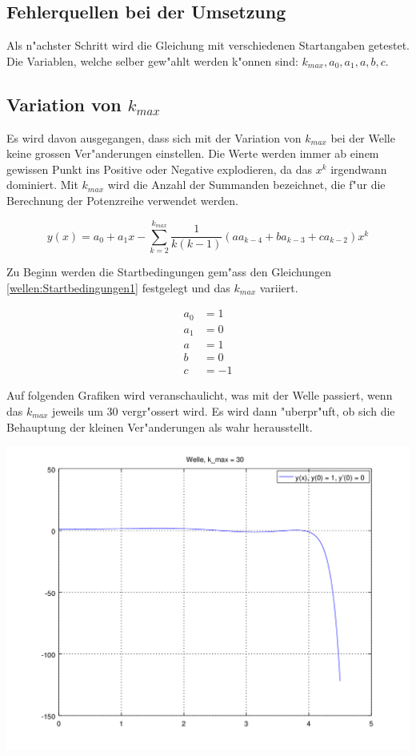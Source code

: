 \begin{refsection}
\section{Fehlerquellen bei der Umsetzung}
Als n"achster Schritt wird die Gleichung mit verschiedenen Startangaben 
getestet. Die Variablen, welche selber gew"ahlt werden k"onnen sind: $k_{max}, 
a_0, 
a_1, a, b, c$.

\subsection{Variation von $k_{max}$}

Es wird davon ausgegangen, dass sich mit der Variation von $k_{max}$ bei der 
Welle keine grossen Ver"anderungen einstellen. Die Werte werden immer ab einem 
gewissen Punkt ins Positive oder Negative explodieren, da das $x^k$ irgendwann 
dominiert. Mit $k_{max}$ wird die Anzahl der Summanden bezeichnet, die f"ur die 
Berechnung der Potenzreihe verwendet werden. 

\begin{equation*}
y(x) = a_0 + a_1x 
-\sum_{k=2}^{k_{max}}\frac{1}{k(k-1)}(aa_{k-4}+ba_{k-3}+ca_{k-2})x^k
\end{equation*}

Zu Beginn werden die Startbedingungen gem"ass den Gleichungen 
\ref{wellen:Startbedingungen1} festgelegt und das $k_{max}$ variiert.

\begin{equation}
	\begin{split}
		a_0 &= 1\\
		a_1 &= 0\\
		a &= 1\\
		b &= 0\\
		c &= -1
	\end{split}
	\label{wellen:Startbedingungen1}
\end{equation}

Auf folgenden Grafiken wird veranschaulicht, was mit der Welle passiert, wenn 
das $k_{max}$ jeweils um 30 vergr"ossert wird. Es wird dann "uberpr"uft, ob 
sich die Behauptung der kleinen Ver"anderungen als wahr herausstellt.


\includegraphics[scale=0.3]{./wellen/octave/images/kmax/ak30wave.png}



\end{refsection}
